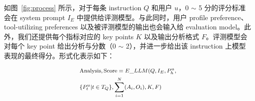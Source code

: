 \documentclass[11pt]{article}
\begin{document}
如图~\ref{fig:process} 所示，对于每条 instruction $Q$ 和用户 $u$，0 $\sim$ 5 分的评分标准会在 system prompt $I_E$ 中提供给评测模型。与此同时，用户 profile preference、tool-utilizing preferences 以及被评测模型的输出也会输入给 evaluation model。此外，我们还提供每个指标对应的 key points $K$ 以及输出分析格式 $F$。评测模型会对每个 key point 给出分析与分数（0 $\sim$ 2），并进一步给出该 instruction 上模型表现的最终得分。形式化表示如下：


\begin{equation}
\footnotesize
\begin{aligned}
    & \text{Analysis}, \text{Score} = E\_LLM(Q, I_E, P_h^u, \\ &\{P_t^u|t \in T_Q\}, \sum_{i=1}^{N}(A_i, O_i), K, F)
\end{aligned}
\end{equation}
\end{document}
